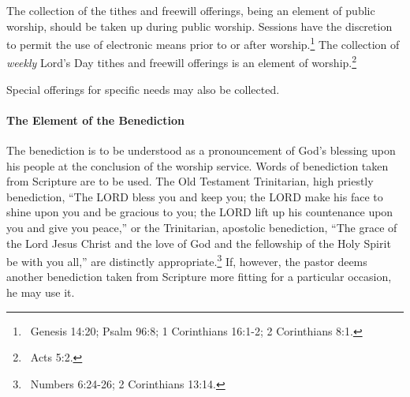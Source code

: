 \begin{outerlst}[left=0pt,labelsep=0pt]
\begin{innerlst}[resume*]
      \item The collection of the tithes and freewill offerings, being an element of public worship, should be taken up during public worship. Sessions have the discretion to permit the use of electronic means prior to or after worship.\footnote{\ Genesis 14:20; Psalm 96:8; 1 Corinthians 16:1-2; 2 Corinthians 8:1.} The collection of \textit{weekly} Lord's Day tithes and freewill offerings is an element of worship.\footnote{\ Acts 5:2.} 
      \item Special offerings for specific needs may also be collected. 
\end{innerlst} 

\paragraph[The Element of the Benediction]{The Element of the Benediction}  

\begin{innerlst}[resume*]
      \item The benediction is to be understood as a pronouncement of God's blessing upon his people at the conclusion of the worship service. Words of benediction taken from Scripture are to be used. The Old Testament Trinitarian, high priestly benediction, ``The LORD bless you and keep you; the LORD make his face to shine upon you and be gracious to you; the LORD lift up his countenance upon you and give you peace,'' or the Trinitarian, apostolic benediction, ``The grace of the Lord Jesus Christ and the love of God and the fellowship of the Holy Spirit be with you all,'' are distinctly appropriate.\footnote{\ Numbers 6:24-26; 2 Corinthians 13:14.} If, however, the pastor deems another benediction taken from Scripture more fitting for a particular occasion, he may use it. 
\end{innerlst} 


\end{outerlst}
